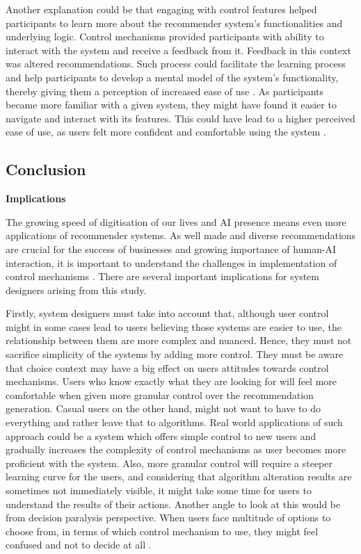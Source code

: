 \documentclass[a4paper,12pt]{article}
\begin{document}
Another explanation could be that engaging with control features helped participants to learn more about the recommender system's functionalities and underlying logic. Control mechanisms provided participants with ability to interact with the system and receive a feedback from it. Feedback in this context was altered recommendations. Such process could facilitate the learning process and help participants to develop a mental model of the system's functionality, thereby giving them a perception of increased ease of use \citep{norman2013design}. As participants became more familiar with a given system, they might have found it easier to navigate and interact with its features. This could have lead to a higher perceived ease of use, as users felt more confident and comfortable using the system \citep{venkateshDeterminantsPerceivedEase2000}. 

\subsection{Conclusion}

\textbf{Implications}

The growing speed of digitisation of our lives and AI presence means even more applications of recommender systems. As well made and diverse recommendations are crucial for the success of businesses and growing importance of human-AI interaction, it is important to understand the challenges in implementation of control mechanisms \citep{dietvorstEtAl18, songWhenHowDiversify2019}. There are several important implications for system designers arising from this study.

Firstly, system designers must take into account that, although user control might in some cases lead to users believing those systems are easier to use, the relationship between them are more complex and nuanced. Hence, they must not sacrifice simplicity of the systems by adding more control. They must be aware that choice context may have a big effect on users attitudes towards control mechanisms. Users who know exactly what they are looking for will feel more comfortable when given more granular control over the recommendation generation. Casual users on the other hand, might not want to have to do everything and rather leave that to algorithms. Real world applications of such approach could be a system which offers simple control to new users and gradually increases the complexity of control mechanisms as user becomes more proficient with the system. Also, more granular control will require a steeper learning curve for the users, and considering that algorithm alteration results are sometimes not immediately visible, it might take some time for users to understand the results of their actions. Another angle to look at this would be from decision paralysis perspective. When users face multitude of options to choose from, in terms of which control mechanism to use, they might feel confused and not to decide at all \citep{schwartz2004paradox}.
\end{document}
